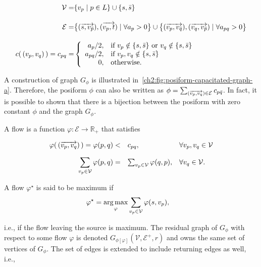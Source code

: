 \begin{align*}
	\mathcal{V} =& \{ v_p \; | \; p \in L \} \cup \{s,\bar{s}\} \\[1em]
	\mathcal{E} =& \big\{ ( \overrightarrow{ s,v_{\bar{p}}} ),( \overrightarrow{ v_p,t} ) \; | \; \forall a_p>0 \big\} \cup \big\{ ( \overrightarrow{ v_p,v_{\bar{q}}} ), ( \overrightarrow{ v_q,v_{\bar{p}}} ) \; | \; \forall a_{pq} > 0 \big\}  \\[1em]
	c(\, (v_p,v_q)\, ) = c_{pq} =& \left\{ \begin{array}{rl}
		a_{p}/2, & \text{if } v_p \notin \{s,\bar{s}\} \text{ or } v_q \notin \{s,\bar{s}\} \\
		a_{pq}/2, & \text{if } v_p,v_q \notin \{s,\bar{s}\}\\ 
		0,& \text{otherwise}.
	\end{array}\right.
\end{align*}

A construction of graph $G_{\phi}$ is illustrated in~\cref{ch2:fig:posiform-capacitated-graph-a}. Therefore, the posiform $\phi$ can also be written as $\phi = \sum_{ ( \overrightarrow{ v_p,v_q} ) \in \mathcal{E}}{ c_{p\bar{q}} }$. In fact, it is possible to shown that there is a bijection between the posiform with zero constant $\phi$ and the graph $G_{\phi}$.


A flow is a function $\varphi:\mathcal{E}\rightarrow \mathbb{R}_{+}$ that satisfies

\begin{equation*}
	\begin{array}{rll}
	\displaystyle
	\varphi(\,( \overrightarrow{ v_p,v_q} )\,) = \varphi (p,q) <& c_{pq},&  \forall v_p,v_q \in \mathcal{V} \\[1em]
	\displaystyle
	\sum_{v_p \in \mathcal{V}}{\varphi(p,q)} =& \sum_{v_p \in \mathcal{V}}{\varphi (q,p)}, & \forall v_q \in \mathcal{V}.	
	\end{array}
\end{equation*}

A flow $\varphi ^{\star}$ is said to be maximum if 
\begin{align*}
	\varphi ^{\star} &= \operatorname*{arg\,max}_{\varphi} \sum_{v_p \in \mathcal{V}}{\varphi(s,v_p)},
\end{align*}

i.e., if the flow leaving the source is maximum. The residual graph of $G_{\phi}$ with respect to some flow $\varphi$ is denoted $G_{ \phi [ \varphi ] }(\mathcal{V},\mathcal{E}^+,r)$ and owns the same set of vertices of $G_{\phi}$. The set of edges is extended to include returning edges as well, i.e.,


